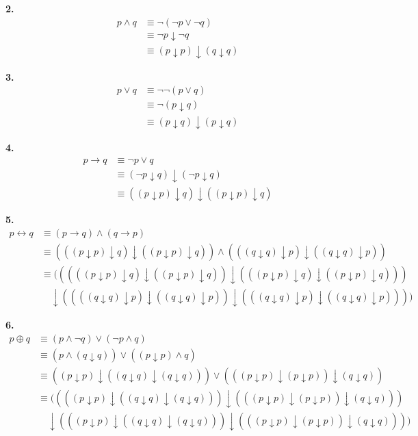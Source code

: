 \documentclass[12pt,a4paper]{article}
\theoremstyle{definition}
\begin{document}
\textbf{2.}
\begin{align*}
p \land q &\equiv \neg(\neg p \lor \neg q) \\
&\equiv \neg p \downarrow \neg q \tag{$*$}\\
&\equiv (p \downarrow p) \downarrow (q \downarrow q)
\end{align*}

\textbf{3.}
\begin{align*}
p \lor q &\equiv \neg\neg(p \lor q) \\
&\equiv \neg(p \downarrow q) \tag{$*$}\\
&\equiv (p \downarrow q) \downarrow (p \downarrow q)
\end{align*}

\textbf{4.}
\begin{align*}
p \to q &\equiv \neg p \lor q \tag{$*$}\\
&\equiv (\neg p \downarrow q) \downarrow (\neg p \downarrow q) \\
&\equiv ((p \downarrow p) \downarrow q) \downarrow ((p \downarrow p) \downarrow q)
\end{align*}

\textbf{5.}
\begin{align*}
p \leftrightarrow q &\equiv (p \to q) \land (q \to p) \tag{$*$}\\
&\equiv (((p \downarrow p) \downarrow q) \downarrow ((p \downarrow p) \downarrow q)) \land (((q \downarrow q) \downarrow p) \downarrow ((q \downarrow q) \downarrow p)) \\
&\equiv (((((p \downarrow p) \downarrow q) \downarrow ((p \downarrow p) \downarrow q)) \downarrow (((p \downarrow p) \downarrow q) \downarrow ((p \downarrow p) \downarrow q))) \\
&\quad \downarrow ((((q \downarrow q) \downarrow p) \downarrow ((q \downarrow q) \downarrow p)) \downarrow (((q \downarrow q) \downarrow p) \downarrow ((q \downarrow q) \downarrow p))))
\end{align*}

\textbf{6.}
\begin{align*}
p \oplus q &\equiv (p \land \neg q) \lor (\neg p \land q) \tag{$*$}\\
&\equiv (p \land (q \downarrow q)) \lor ((p \downarrow p) \land q) \\
&\equiv ((p \downarrow p) \downarrow ((q \downarrow q) \downarrow (q \downarrow q))) \lor (((p \downarrow p) \downarrow (p \downarrow p)) \downarrow (q \downarrow q)) \\
&\equiv ((((p \downarrow p) \downarrow ((q \downarrow q) \downarrow (q \downarrow q))) \downarrow (((p \downarrow p) \downarrow (p \downarrow p)) \downarrow (q \downarrow q))) \\
&\quad \downarrow (((p \downarrow p) \downarrow ((q \downarrow q) \downarrow (q \downarrow q))) \downarrow (((p \downarrow p) \downarrow (p \downarrow p)) \downarrow (q \downarrow q))))
\end{align*}
\end{document}
